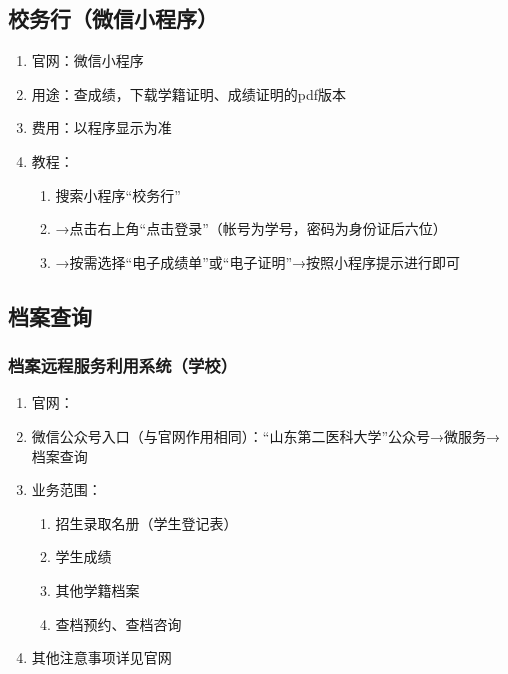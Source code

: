 \subsection[校务行（微信小程序）]{校务行（微信小程序）}
\label{cert_prover}
\begin{enumerate}
    \item 官网：微信小程序
    \item 用途：查成绩，下载学籍证明、成绩证明的pdf版本
    \item 费用：以程序显示为准
    \item 教程：
          \begin{enumerate}
              \item 搜索小程序“校务行”
              \item →点击右上角“点击登录”（帐号为学号，密码为身份证后六位）\footnotemark
              \item →按需选择“电子成绩单”或“电子证明”→按照小程序提示进行即可
          \end{enumerate}
\end{enumerate}

\subsection[档案查询]{档案查询}
\subsubsection[档案远程服务利用系统（学校）]{档案远程服务利用系统（学校）}
\begin{enumerate}
    \item 官网：
    \item 微信公众号入口（与官网作用相同）：“山东第二医科大学”公众号→微服务→档案查询
    \item 业务范围：
          \begin{enumerate}
              \item 招生录取名册（学生登记表）
              \item 学生成绩
              \item 其他学籍档案
              \item 查档预约、查档咨询
          \end{enumerate}
    \item 其他注意事项详见官网
\end{enumerate}
